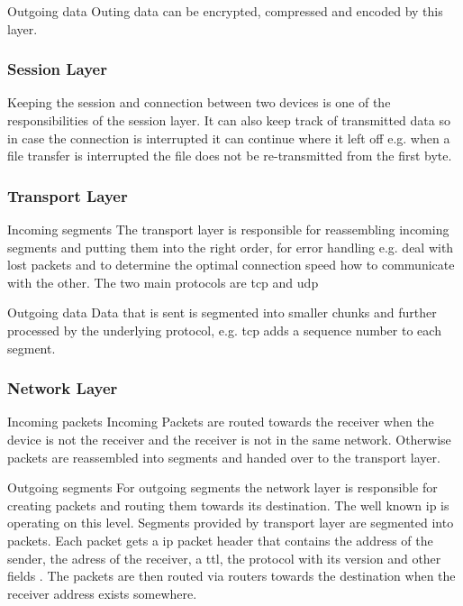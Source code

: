 Outgoing data\newline
Outing data can be encrypted, compressed and encoded by this layer.

\subsubsection{Session Layer}
Keeping the session and connection between two devices is one of the responsibilities of the session layer. It can also keep track of transmitted data so in case the connection is interrupted it can continue where it left off e.g. when a file transfer is interrupted the file does not be re-transmitted from the first byte. 

\subsubsection{Transport Layer}
Incoming segments\newline
The transport layer is responsible for reassembling incoming segments and putting them into the right order, for error handling e.g. deal with lost packets and to determine the optimal connection speed how to communicate with the other. 
The two main protocols are \gls{tcp} and \gls{udp}

Outgoing data\newline
Data that is sent is segmented into smaller chunks and further processed by the underlying protocol, e.g. \gls{tcp} adds a sequence number to each segment.

\subsubsection{Network Layer}
Incoming packets\newline
Incoming Packets are routed towards the receiver when the device is not the receiver and the receiver is not in the same network. Otherwise packets are  reassembled into segments and handed over to the transport layer.

Outgoing segments\newline
For outgoing segments the network layer is responsible for creating packets and routing them towards its destination.
The well known \gls{ip} is operating on this level. Segments provided by transport layer  are segmented into packets. Each packet gets a \gls{ip} packet header that contains the address of the sender, the adress of the receiver, a \gls{ttl}, the protocol with its version and other fields \cite{rfc791-ip}. The packets are then routed via routers towards the destination when the receiver address exists somewhere.

